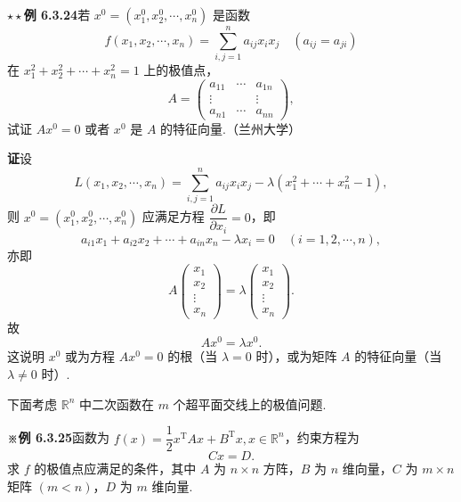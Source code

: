 \documentclass[UTF8, 12pt, fontset=fandol, oneside]{ctexart}
\begin{document}
\noindent\textbf{\ensuremath{\star\star}例 6.3.24}\quad 若 $x^0=(x_1^0,x_2^0,\cdots,x_n^0)$ 是函数
\[
  f(x_1,x_2,\cdots,x_n)=\sum_{i,j=1}^n a_{ij}x_ix_j\quad(a_{ij}=a_{ji})
\]
在 $x_1^2+x_2^2+\cdots+x_n^2=1$ 上的极值点，
\[
  A=\begin{pmatrix}
    a_{11}&\cdots&a_{1n}\\
    \vdots&&\vdots\\
    a_{n1}&\cdots&a_{nn}
  \end{pmatrix},
\]
试证 $Ax^0=0$ 或者 $x^0$ 是 $A$ 的特征向量.（兰州大学）

\noindent\textbf{证}\quad 设
\[
  L(x_1,x_2,\cdots,x_n)=\sum_{i,j=1}^n a_{ij}x_ix_j-\lambda(x_1^2+\cdots+x_n^2-1),
\]
则 $x^0=(x_1^0,x_2^0,\cdots,x_n^0)$ 应满足方程 $\dfrac{\partial L}{\partial x_i}=0$，即
\[
  a_{i1}x_1+a_{i2}x_2+\cdots+a_{in}x_n-\lambda x_i=0
  \quad(i=1,2,\cdots,n),
\]
亦即
\[
  A\begin{pmatrix}
    x_1\\x_2\\ \vdots\\x_n
  \end{pmatrix}
  =
  \lambda\begin{pmatrix}
    x_1\\x_2\\ \vdots\\x_n
  \end{pmatrix}.
\]
故
\[
  Ax^0=\lambda x^0.
\]
这说明 $x^0$ 或为方程 $Ax^0=0$ 的根（当 $\lambda=0$ 时），或为矩阵 $A$ 的特征向量（当 $\lambda\ne0$ 时）.

下面考虑 $\mathbb{R}^n$ 中二次函数在 $m$ 个超平面交线上的极值问题.

\noindent\textbf{※例 6.3.25}\quad 函数为 $f(x)=\dfrac12x^{\mathrm T}Ax+B^{\mathrm T}x,x\in\mathbb{R}^n$，约束方程为
\[
  Cx=D. \tag{1}
\]
求 $f$ 的极值点应满足的条件，其中 $A$ 为 $n\times n$ 方阵，$B$ 为 $n$ 维向量，$C$ 为 $m\times n$ 矩阵 $(m<n)$，$D$ 为 $m$ 维向量.
\end{document}
